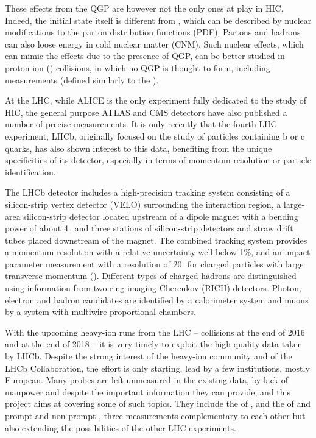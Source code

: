 \documentclass[a4paper,11pt]{article}
\begin{document}
These effects from the QGP are however not the only ones at play in HIC. Indeed, the initial state itself is different from \pp, which can be described by nuclear modifications to the parton distribution functions (PDF). Partons and hadrons can also loose energy in cold nuclear matter (CNM). Such nuclear effects, which can mimic the effects due to the presence of QGP, can be better studied in proton-ion (\pA) collisions, in which no QGP is thought to form, including \rpa measurements (defined similarly to the \raa).



At the LHC, while
ALICE is the only experiment fully dedicated to the study of HIC, the general purpose ATLAS and CMS detectors have also published a number of precise
measurements. It is only recently that the fourth LHC experiment, LHCb, originally focused on the study of particles containing b or c quarks, 
has also shown interest to this data, benefiting from the unique 
specificities of its detector, especially in terms of momentum resolution or particle identification. 

The LHCb detector includes a high-precision tracking system consisting of a silicon-strip vertex detector (VELO) surrounding the interaction region, a large-area silicon-strip detector located upstream of a dipole magnet with a bending power of about 4\,\tesla\meter, and three stations of silicon-strip detectors and straw drift tubes placed downstream of the magnet. The combined tracking system provides a momentum resolution with a relative uncertainty well below 1\%, and an impact parameter
 measurement with a resolution of 20\,\micro\meter\ for charged particles with large transverse momentum (\pt). Different types of charged hadrons are distinguished using information from two ring-imaging Cherenkov (RICH) detectors. Photon, electron and hadron candidates
are identified by a calorimeter system
and muons by a system with multiwire proportional chambers.

With the upcoming heavy-ion runs from the LHC -- \ppb collisions at the end of 2016 and \pbpb at the end of 2018 --
it is very timely to exploit the high quality data taken by LHCb. Despite the strong interest of the heavy-ion community and of the LHCb Collaboration,
the effort is only starting, lead by a few institutions, mostly European. Many probes are left unmeasured in the existing data, by lack of manpower and despite the important
information they can provide, and this project aims at covering some of such topics. They include the \rpa of \PgUabc, and the \raa of \Dz and prompt and non-prompt \Jpsi, three measurements complementary to each other but also extending the possibilities of the other LHC experiments.
\end{document}
